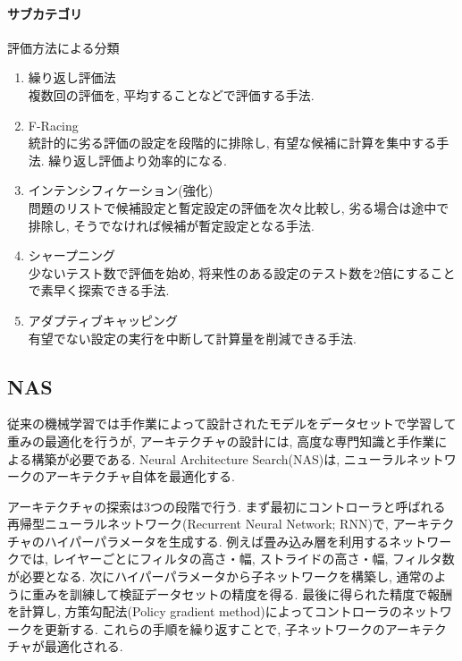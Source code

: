 \documentclass[twocolumn]{jarticle}     %
\begin{document}
\paragraph{サブカテゴリ}
評価方法による分類
\begin{enumerate}
  \item 繰り返し評価法 \\
  複数回の評価を, 平均することなどで評価する手法.

  \item F-Racing \\
  統計的に劣る評価の設定を段階的に排除し, 有望な候補に計算を集中する手法. 繰り返し評価より効率的になる.

  \item インテンシフィケーション(強化) \\
  問題のリストで候補設定と暫定設定の評価を次々比較し, 劣る場合は途中で排除し, そうでなければ候補が暫定設定となる手法.

  \item シャープニング \\
  少ないテスト数で評価を始め, 将来性のある設定のテスト数を2倍にすることで素早く探索できる手法.

  \item アダプティブキャッピング  \\
  有望でない設定の実行を中断して計算量を削減できる手法.
\end{enumerate}

\subsection{NAS}
従来の機械学習では手作業によって設計されたモデルをデータセットで学習して重みの最適化を行うが, アーキテクチャの設計には, 高度な専門知識と手作業による構築が必要である.
Neural Architecture Search(NAS)\cite{DBLP:journals/corr/ZophL16}は, ニューラルネットワークのアーキテクチャ自体を最適化する.



アーキテクチャの探索は3つの段階で行う.
まず最初にコントローラと呼ばれる再帰型ニューラルネットワーク(Recurrent Neural Network; RNN)で, アーキテクチャのハイパーパラメータを生成する.
例えば畳み込み層を利用するネットワークでは, レイヤーごとにフィルタの高さ・幅, ストライドの高さ・幅, フィルタ数が必要となる.
次にハイパーパラメータから子ネットワークを構築し, 通常のように重みを訓練して検証データセットの精度を得る.
最後に得られた精度で報酬を計算し, 方策勾配法(Policy gradient method)によってコントローラのネットワークを更新する.
これらの手順を繰り返すことで, 子ネットワークのアーキテクチャが最適化される.
\end{document}
